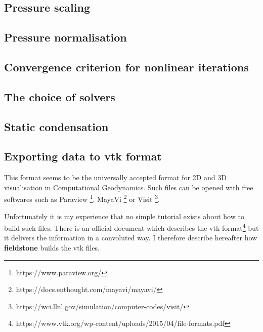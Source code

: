 \documentclass[a4paper]{article}
\newcommand{\fieldstone}{{\bf fieldstone}}
\begin{document}
\newpage %
\subsection{Pressure scaling}  %

\newpage %
\subsection{Pressure normalisation} %

\newpage %
\subsection{Convergence criterion for nonlinear iterations}


\subsection{The choice of solvers}  %


\newpage
\subsection{Static condensation} 




\newpage
\subsection{Exporting data to vtk format}

This format seems to be the universally accepted format for 2D and 3D visualisation in 
Computational Geodynamics. Such files can be opened with free softwares such as 
Paraview \footnote{https://www.paraview.org/}, MayaVi \footnote{https://docs.enthought.com/mayavi/mayavi/}
or Visit \footnote{https://wci.llnl.gov/simulation/computer-codes/visit/}.

Unfortunately it is my experience that no simple tutorial exists about how to build 
such files. There is an official document which describes the vtk 
format\footnote{https://www.vtk.org/wp-content/uploads/2015/04/file-formats.pdf}
but it delivers the information in a convoluted way. I therefore describe hereafter 
how \fieldstone{} builds the vtk files. 
\end{document}
